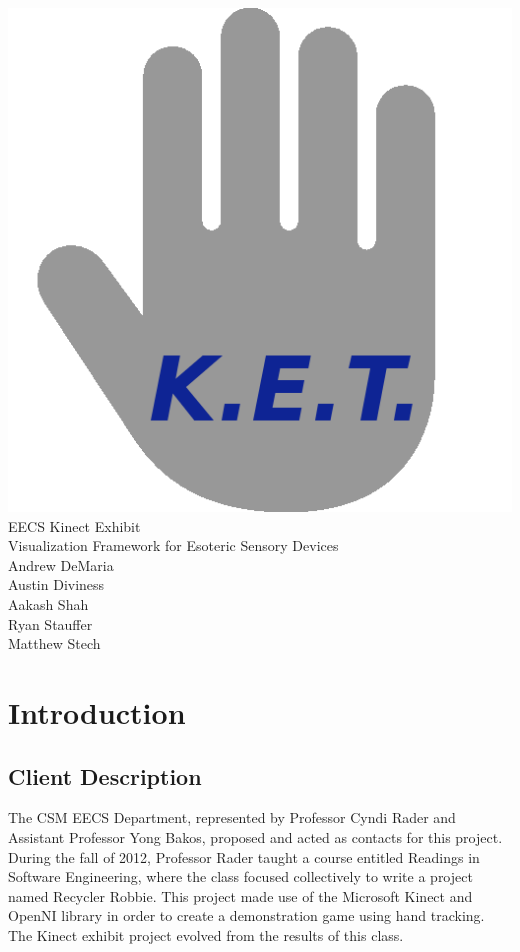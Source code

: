 \documentclass[11pt,letterpaper]{article}
\begin{document}
	\begin{center}
	\vspace*{\fill}
	\includegraphics[height=0.4\textheight]{logo} \\
	\linespread{2}
	\LARGE EECS Kinect Exhibit \\
	\Large Visualization Framework for Esoteric Sensory Devices \\
	\large Andrew DeMaria \\
	\linespread{1}
	\large Austin Diviness \\
	\large Aakash Shah \\
	\large Ryan Stauffer \\
	\large Matthew Stech \\
	\vspace*{\fill}
	\end{center}
	\thispagestyle{empty}
	\pagebreak
 
	\tableofcontents
	\thispagestyle{empty}
	\newpage
 
	\pagestyle{plain}
	\setcounter{page}{1}
	\section{Introduction}
	\subsection{Client Description}
	The CSM EECS Department, represented by Professor Cyndi Rader and 
	Assistant Professor Yong Bakos, proposed and acted as contacts for this 
	project. During the fall of 2012, Professor Rader taught a course entitled 
	Readings in Software Engineering, where the class focused collectively to 
	write a project named Recycler Robbie. This project made use of the 
	Microsoft Kinect and OpenNI library in order to create a demonstration 
	game using hand tracking. The Kinect exhibit project evolved from the 
	results of this class.
 
\end{document}
